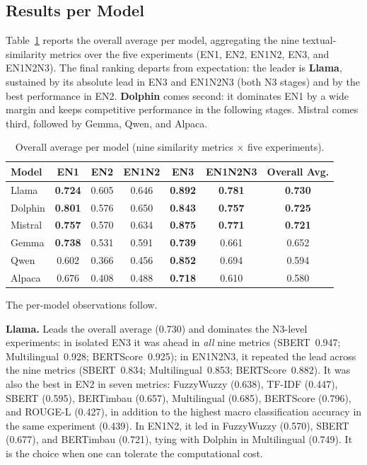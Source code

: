 \documentclass[a4paper,fleqn]{cas-sc}
\newcommand{\melhor}[1]{\textcolor{green!55!black}{#1}}
\newcommand{\pior}[1]{\textcolor{red!80!black}{#1}}
\begin{document}
\subsection{Results per Model}

Table~\ref{tab:ranking_global} reports the overall average per model, aggregating the nine textual-similarity metrics over the five experiments (EN1, EN2, EN1N2, EN3, and EN1N2N3). The final ranking departs from expectation: the leader is \textbf{Llama}, sustained by its absolute lead in EN3 and EN1N2N3 (both N3 stages) and by the best performance in EN2. \textbf{Dolphin} comes second: it dominates EN1 by a wide margin and keeps competitive performance in the following stages. Mistral comes third, followed by Gemma, Qwen, and Alpaca.

\begin{table}[ht]
\centering
\caption{Overall average per model (nine similarity metrics $\times$ five experiments).}
\label{tab:ranking_global}
\small
\begin{tabular}{lcccccc}
\hline
Model   & EN1   & EN2   & EN1N2 & EN3   & EN1N2N3 & Overall Avg. \\
\hline
Llama   & \textbf{0.724} & \melhor{0.605} & 0.646 & \melhor{\textbf{0.892}} & \melhor{\textbf{0.781}} & \melhor{\textbf{0.730}} \\
Dolphin & \melhor{\textbf{0.801}} & 0.576 & \melhor{0.650} & \textbf{0.843} & \textbf{0.757} & \textbf{0.725} \\
Mistral & \textbf{0.757} & 0.570 & 0.634 & \textbf{0.875} & \textbf{0.771} & \textbf{0.721} \\
Gemma   & \textbf{0.738} & 0.531 & 0.591 & \textbf{0.739} & 0.661 & 0.652 \\
Qwen    & \pior{0.602} & \pior{0.366} & \pior{0.456} & \textbf{0.852} & 0.694 & 0.594 \\
Alpaca  & 0.676 & 0.408 & 0.488 & \pior{\textbf{0.718}} & \pior{0.610} & \pior{0.580} \\
\hline
\end{tabular}
\end{table}

The per-model observations follow.

\textbf{Llama.} Leads the overall average (0.730) and dominates the N3-level experiments: in isolated EN3 it was ahead in \textit{all} nine metrics (SBERT~0.947; Multilingual~0.928; BERTScore~0.925); in EN1N2N3, it repeated the lead across the nine metrics (SBERT~0.834; Multilingual~0.853; BERTScore~0.882). It was also the best in EN2 in seven metrics: FuzzyWuzzy (0.638), TF-IDF (0.447), SBERT (0.595), BERTimbau (0.657), Multilingual (0.685), BERTScore (0.796), and ROUGE-L (0.427), in addition to the highest macro classification accuracy in the same experiment (0.439). In EN1N2, it led in FuzzyWuzzy (0.570), SBERT (0.677), and BERTimbau (0.721), tying with Dolphin in Multilingual (0.749). It is the choice when one can tolerate the computational cost.
\end{document}
